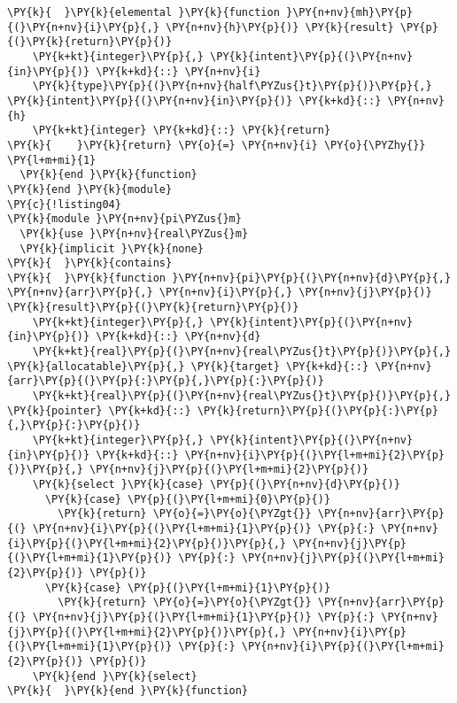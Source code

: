 \begin{Verbatim}[commandchars=\\\{\}]
\PY{k}{  }\PY{k}{elemental }\PY{k}{function }\PY{n+nv}{mh}\PY{p}{(}\PY{n+nv}{i}\PY{p}{,} \PY{n+nv}{h}\PY{p}{)} \PY{k}{result} \PY{p}{(}\PY{k}{return}\PY{p}{)}
    \PY{k+kt}{integer}\PY{p}{,} \PY{k}{intent}\PY{p}{(}\PY{n+nv}{in}\PY{p}{)} \PY{k+kd}{::} \PY{n+nv}{i} 
    \PY{k}{type}\PY{p}{(}\PY{n+nv}{half\PYZus{}t}\PY{p}{)}\PY{p}{,} \PY{k}{intent}\PY{p}{(}\PY{n+nv}{in}\PY{p}{)} \PY{k+kd}{::} \PY{n+nv}{h}
    \PY{k+kt}{integer} \PY{k+kd}{::} \PY{k}{return}
\PY{k}{    }\PY{k}{return} \PY{o}{=} \PY{n+nv}{i} \PY{o}{\PYZhy{}} \PY{l+m+mi}{1}
  \PY{k}{end }\PY{k}{function}
\PY{k}{end }\PY{k}{module}
\PY{c}{!listing04}
\PY{k}{module }\PY{n+nv}{pi\PYZus{}m}
  \PY{k}{use }\PY{n+nv}{real\PYZus{}m}
  \PY{k}{implicit }\PY{k}{none}
\PY{k}{  }\PY{k}{contains}
\PY{k}{  }\PY{k}{function }\PY{n+nv}{pi}\PY{p}{(}\PY{n+nv}{d}\PY{p}{,} \PY{n+nv}{arr}\PY{p}{,} \PY{n+nv}{i}\PY{p}{,} \PY{n+nv}{j}\PY{p}{)} \PY{k}{result}\PY{p}{(}\PY{k}{return}\PY{p}{)}
    \PY{k+kt}{integer}\PY{p}{,} \PY{k}{intent}\PY{p}{(}\PY{n+nv}{in}\PY{p}{)} \PY{k+kd}{::} \PY{n+nv}{d}
    \PY{k+kt}{real}\PY{p}{(}\PY{n+nv}{real\PYZus{}t}\PY{p}{)}\PY{p}{,} \PY{k}{allocatable}\PY{p}{,} \PY{k}{target} \PY{k+kd}{::} \PY{n+nv}{arr}\PY{p}{(}\PY{p}{:}\PY{p}{,}\PY{p}{:}\PY{p}{)}
    \PY{k+kt}{real}\PY{p}{(}\PY{n+nv}{real\PYZus{}t}\PY{p}{)}\PY{p}{,} \PY{k}{pointer} \PY{k+kd}{::} \PY{k}{return}\PY{p}{(}\PY{p}{:}\PY{p}{,}\PY{p}{:}\PY{p}{)}
    \PY{k+kt}{integer}\PY{p}{,} \PY{k}{intent}\PY{p}{(}\PY{n+nv}{in}\PY{p}{)} \PY{k+kd}{::} \PY{n+nv}{i}\PY{p}{(}\PY{l+m+mi}{2}\PY{p}{)}\PY{p}{,} \PY{n+nv}{j}\PY{p}{(}\PY{l+m+mi}{2}\PY{p}{)}
    \PY{k}{select }\PY{k}{case} \PY{p}{(}\PY{n+nv}{d}\PY{p}{)} 
      \PY{k}{case} \PY{p}{(}\PY{l+m+mi}{0}\PY{p}{)} 
        \PY{k}{return} \PY{o}{=}\PY{o}{\PYZgt{}} \PY{n+nv}{arr}\PY{p}{(} \PY{n+nv}{i}\PY{p}{(}\PY{l+m+mi}{1}\PY{p}{)} \PY{p}{:} \PY{n+nv}{i}\PY{p}{(}\PY{l+m+mi}{2}\PY{p}{)}\PY{p}{,} \PY{n+nv}{j}\PY{p}{(}\PY{l+m+mi}{1}\PY{p}{)} \PY{p}{:} \PY{n+nv}{j}\PY{p}{(}\PY{l+m+mi}{2}\PY{p}{)} \PY{p}{)}   
      \PY{k}{case} \PY{p}{(}\PY{l+m+mi}{1}\PY{p}{)} 
        \PY{k}{return} \PY{o}{=}\PY{o}{\PYZgt{}} \PY{n+nv}{arr}\PY{p}{(} \PY{n+nv}{j}\PY{p}{(}\PY{l+m+mi}{1}\PY{p}{)} \PY{p}{:} \PY{n+nv}{j}\PY{p}{(}\PY{l+m+mi}{2}\PY{p}{)}\PY{p}{,} \PY{n+nv}{i}\PY{p}{(}\PY{l+m+mi}{1}\PY{p}{)} \PY{p}{:} \PY{n+nv}{i}\PY{p}{(}\PY{l+m+mi}{2}\PY{p}{)} \PY{p}{)}   
    \PY{k}{end }\PY{k}{select}
\PY{k}{  }\PY{k}{end }\PY{k}{function}


\end{Verbatim}
